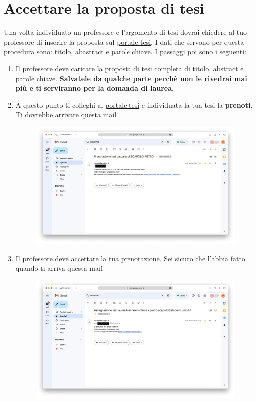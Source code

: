 \documentclass[12pt]{article}
\begin{document}
\section{Accettare la proposta di tesi}
Una volta individuato un professore e l'argomento di tesi dovrai chiedere al tuo professore di inserire la proposta sul \href{https://tesi.dfa.unipd.it/tesi/}{portale tesi}. I dati che servono per questa procedura sono: titolo, abastract e parole chiave. 
I passaggi poi sono i seguenti:
\begin{enumerate}
	\item Il professore deve caricare la proposta di tesi completa di titolo, abstract e parole chiave. \textbf{Salvatele da qualche parte perchè non le rivedrai mai più e ti serviranno per la domanda di laurea}.
	\item A questo punto ti colleghi al \href{https://tesi.dfa.unipd.it/tesi/}{portale tesi} e individuata la tua tesi la \textbf{prenoti}. Ti dovrebbe arrivare questa mail
	
	\begin{figure}[H]
    \centering
  		\includegraphics[width=1.\textwidth]{images/prenotazionetesi.pdf}
	\end{figure}
	\newpage
	\item Il professore deve accettare la tua prenotazione. Sei sicuro che l'abbia fatto quando ti arriva questa mail
		\begin{figure}[H]
    \centering
  		\includegraphics[width=1.\textwidth]{images/assegnazionetesi.pdf}
	\end{figure}
\end{enumerate}
\end{document}
